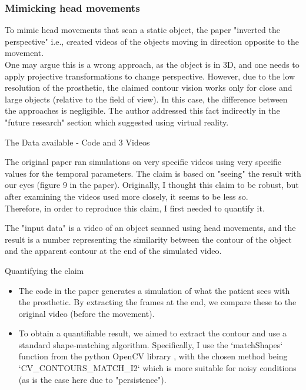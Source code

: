 \documentclass[]{beamer}
\theoremstyle{remark}
\begin{document}
\begin{frame}
\frametitle{Mimicking head movements}

To mimic head movements that scan a static object, the paper "inverted the perspective" i.e., created videos of the objects moving in direction opposite to the movement. \\

One may argue this is a wrong approach, as the object is in 3D, and one needs to apply projective transformations to change perspective. However, due to the low resolution of the prosthetic, the claimed contour vision works only for close and large objects (relative to the field of view). In this case, the difference between the approaches is negligible. The author addressed this fact indirectly in the "future research" section which suggested using virtual reality.

\end{frame}

\begin{frame}{The Data available - Code and 3 Videos}

The original paper ran simulations on very specific videos using very specific values for the temporal parameters. The claim is based on "seeing" the result with our eyes (figure 9 in the paper). Originally, I thought this claim to be robust, but after examining the videos used more closely, it seems to be less so. \\
Therefore, in order to reproduce this claim, I first needed to quantify it.

The "input data" is a video of an object scanned using head movements, and the result is a number representing the similarity between the contour of the object and the apparent contour at the end of the simulated video.
\end{frame}

\begin{frame}{Quantifying the claim}
\begin{itemize}
	\item The code in the paper generates a simulation of what the patient sees with the prosthetic. By extracting the frames at the end, we compare these to the original video (before the movement).
	\item 
	To obtain a quantifiable result, we aimed to extract the contour and use a standard shape-matching algorithm. Specifically, I use the `matchShapes` function from the python OpenCV library \cite{opencv_library} , with the chosen method being `CV\_CONTOURS\_MATCH\_I2` which is more suitable for noisy conditions (as is the case here due to "persistence").
\end{itemize}

\end{frame}
\end{document}
